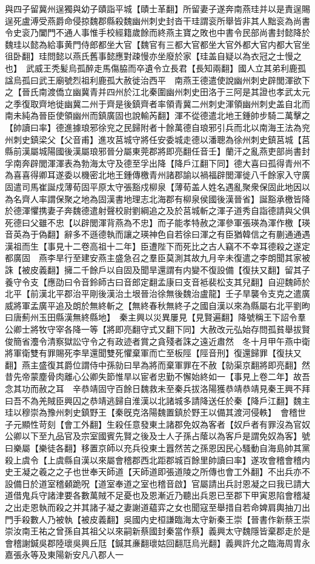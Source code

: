 與四子留冀州逞獨與幼子賾詣平城【賾士革翻】所留妻子遂奔南燕珪并以是責逞賜逞死盧溥受燕爵命侵掠魏郡縣殺魏幽州刺史封沓干珪謂衮所舉皆非其人黜衮為尚書令史衮乃闔門不通人事惟手校經籍歲餘而終燕主寶之敗也中書令民部尚書封懿降於魏珪以懿為給事黄門侍郎都坐大官【魏官有三都大官都坐大官外都大官内都大官坐徂卧翻】珪問懿以燕氏舊事懿應對疎慢亦坐廢於家【珪盖自疑以為衣冠之士慢之也】　武威王秃髪烏孤醉走馬傷脇而卒遺令立長君【長知兩翻】國人立其弟利鹿孤諡烏孤曰武王廟號烈祖利鹿孤大赦徙治西平　南燕王德遣使說幽州刺史辟閭渾欲下之【晉氏南渡僑立幽冀青并四州於江北秦圍幽州刺史田洛于三阿是其證也孝武太元之季復取齊地徙幽冀二州于齊是後鎮齊者率領青冀二州刺史渾領幽州刺史盖自北而南未純為晉臣使領幽州而鎮廣固也說輸芮翻】渾不從德遣北地王鍾帥步騎二萬擊之【帥讀曰率】德進據琅邪徐兖之民歸附者十餘萬德自琅邪引兵而北以南海王法為兖州刺史鎮梁父【父音甫】進攻莒城守將任安委城走德以潘聰為徐州刺史鎮莒城【莒縣前漢屬城陽國後漢屬琅邪晉分屬東莞郡將即亮翻任音壬】蘭汗之亂燕吏部尚書封孚南奔辟閭渾渾表為勃海太守及德至孚出降【降戶江翻下同】德大喜曰孤得青州不為喜喜得卿耳遂委以機密北地王鍾傳檄青州諸郡諭以禍福辟閭渾徙八千餘家入守廣固遣司馬崔誕戍薄荀固平原太守張豁戍柳泉【薄荀盖人姓名遇亂聚衆保固此地因以為名齊人率謂保聚之地為固漢書地理志北海郡有柳泉侯國後漢晉省】誕豁承檄皆降於德渾懼携妻子奔魏德遣射聲校尉劉綱追之及於莒城斬之渾子道秀自詣德請與父俱死德曰父雖不忠【以辟閭渾背燕為不忠】而子能孝特赦之渾參軍張瑛為渾作檄【瑛音英為于偽翻】辭多不遜德執而讓之瑛神色自若徐曰渾之有臣猶韓信之有蒯通通遇漢祖而生【事見十二卷高祖十二年】臣遭陛下而死比之古人竊不不幸耳德殺之遂定都廣固　燕李旱行至建安燕主盛急召之羣臣莫測其故九月辛未復遣之李朗聞其家被誅【被皮義翻】擁二千餘戶以自固及聞旱還謂有内變不復設備【復扶又翻】留其子養守令支【應劭曰令音鈴師古曰音郎定翻孟康曰支音袛裴松支其兒翻】自迎魏師於北平【前漢北平郡治平剛後漢治土垠晉治徐無後魏治盧龍】壬子旱襲令支克之遣廣威將軍孟廣平追及朗於無終斬之【無終春秋無終子之國自漢以來為縣屬右北平劉昫曰唐薊州玉田縣漢無終縣地】　秦主興以災異屢見【見賢遍翻】降號稱王下詔令羣公卿士將牧守宰各降一等【將即亮翻守式又翻下同】大赦改元弘始存問孤貧舉拔賢俊簡省灋令清察獄訟守令之有政迹者賞之貪殘者誅之遠近肅然　冬十月甲午燕中衛將軍衛雙有罪賜死李旱還聞雙死懼棄軍而亡至板陘【陘音刑】復還歸罪【復扶又翻】燕主盛復其爵位謂侍中孫勍曰旱為將而棄軍罪在不赦【勍渠京翻將即亮翻】然昔先帝蒙塵骨肉離心公卿失節惟旱以宦者忠勤不懈始終如一【事見上卷二年】故吾念其功而赦之耳　辛恭靖固守百餘日魏救未至秦兵拔洛陽獲恭靖恭靖見秦王興不拜曰吾不為羌賊臣興囚之恭靖逃歸自淮漢以北諸城多請降送任於秦【降戶江翻】魏主珪以穆崇為豫州刺史鎮野王【秦旣克洛陽魏置鎮於野王以備其渡河侵軼】　會稽世子元顯性苛刻【會工外翻】生殺任意發東土諸郡免奴為客者【奴戶者有罪沒為官奴公卿以下至九品官及宗室國賓先賢之後及士人子孫占䕃以為客戶是謂免奴為客】號曰樂屬【樂徒各翻】移置京師以充兵役東土囂然苦之孫恩因民心騷動自海島帥其黨殺上虞令【上虞縣自漢以來屬會稽郡西北距郡城百餘里帥讀曰率】遂攻會稽會稽内史王凝之羲之之子也世奉天師道【天師道即張道陵之所傳也會工外翻】不出兵亦不設備日於道室稽顙跪呪【道室奉道之室也稽音啟】官屬請出兵討恩凝之曰我已請大道借鬼兵守諸津要各數萬賊不足憂也及恩漸近乃聽出兵恩已至郡下甲寅恩陷會稽凝之出走恩執而殺之并其諸子凝之妻謝道藴弈之女也聞寇至舉措自若命婢肩輿抽刀出門手殺數人乃被執【被皮義翻】吳國内史桓謙臨海太守新秦王崇【晉書作新蔡王崇崇汝南王祐之曾孫自其祖父以來嗣新蔡國封秦當作蔡】義興太守魏隱皆棄郡走於是會稽謝鍼吳郡陸瓌吳興丘尫【鍼其亷翻瓌姑回翻尫烏光翻】義興許允之臨海周胄永嘉張永等及東陽新安凡八郡人一